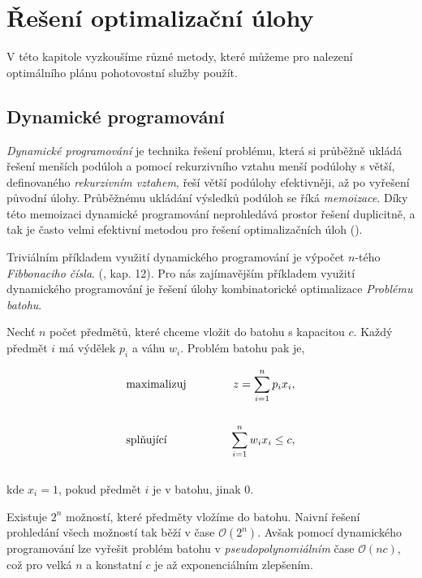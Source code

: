 \chapter{Řešení optimalizační úlohy}\label{chap:reseniOptUloh}

V této kapitole vyzkoušíme různé metody, které můžeme pro nalezení optimálního plánu pohotovostní služby použít.

\section{Dynamické programování}\label{kap:dynamicProgram}

\textit{Dynamické programování} je technika řešení problému, která si průběžně ukládá řešení menších podúloh a pomocí rekurzivního vztahu menší podúlohy s větší,
definovaného \textit{rekurzivním vztahem}, řeší větší podúlohy efektivněji, až po vyřešení původní úlohy. 
Průběžnému ukládání výsledků podúloh se říká \textit{memoizace}.
Díky této memoizaci dynamické programování neprohledává prostor řešení duplicitně, a tak je často velmi efektivní metodou pro řešení optimalizačních úloh (\citet{dynamic}).

Triviálním příkladem využití dynamického programování je výpočet $n$-tého \textit{Fibbonaciho čísla}. (\citet{mares}, kap. 12).
Pro nás zajímavějším příkladem využití dynamického programování je řešení úlohy kombinatorické optimalizace \textit{Problému batohu}.

\begin{definice}
  Nechť $n$ počet předmětů, které chceme vložit do batohu s kapacitou $c$.
  Každý předmět $i$ má výdělek $p_i$ a váhu $w_i$. Problém batohu pak je,

  \begin{alignat*}{2}
    &\normalfont \text{maximalizuj} \hspace{30pt} &z = \sum_{i=1}^n p_i x_i, \\
    \\
    &\normalfont \text{splňující}   \hspace{30pt} &\sum_{i = 1}^{n} w_i x_i \leq c,
  \end{alignat*}
  \\
  kde $x_i = 1$, pokud předmět $i$ je v batohu, jinak $0$.
  \\
\end{definice}

Existuje $2^n$ možností, které předměty vložíme do batohu. Naivní řešení prohledání všech možností tak běží v čase $\mathcal{O} (2^n)$.
Avšak pomocí dynamického programování lze vyřešit problém batohu v \textit{pseudopolynomiálním} čase $\mathcal{O}(nc)$,
což pro velká $n$ a konstatní $c$ je až exponenciálním zlepšením.

